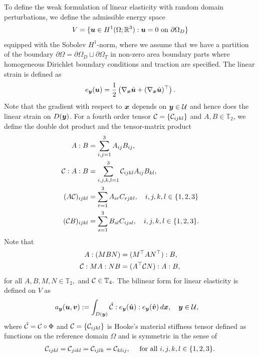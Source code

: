 To define the weak formulation of linear elasticity with random domain perturbations, we define the admissible energy space 
\begin{align}\label{eq:def_Vspace}
    V = \{ {\boldsymbol{u}} \in H^1(\Omega;\mathbb{R}^3) :  {\boldsymbol{u}} =  0  \text{ on }\partial \Omega_D   \}
\end{align}
equipped with the Sobolev $H^1$-norm, where we assume that we have a partition of the boundary $\partial \Omega  = \partial \Omega_D \sqcup \partial \Omega_T$ in non-zero area boundary parts where homogeneous Dirichlet boundary conditions and traction are specified. 
The linear strain is defined as 
\begin{align*}
    e_{{\boldsymbol{y}}}({\boldsymbol{u}}) = \frac 1 2 \left(  \nabla_{{\boldsymbol{x}}} \hat {{\boldsymbol{u}}} +  (\nabla_{{\boldsymbol{x}}} \hat {{\boldsymbol{u}}})^\top \right).
\end{align*}
Note that the gradient with respect to ${\boldsymbol{x}}$ depends on ${\boldsymbol{y}} \in \mathcal{U}$ and hence does the linear strain on $D({\boldsymbol{y}})$.
For a fourth order tensor $\mathcal{C} = \{ \mathcal{C}_{ijkl}\}$ and $A,B \in \mathbb{T}_2$, we define the double dot product and the tensor-matrix product
\begin{align*}
    A : B &= \sum_{i,j=1}^3 A_{ij} B_{ij},  \\
    \mathcal{C} : A :B &= \sum_{i,j,k,l=1}^3 \mathcal{C}_{ijkl} A_{ij}B_{kl}, \\
    (A\mathcal{C})_{ijkl} &= \sum_{r=1}^3 A_{ir} C_{rjkl}, \quad i,j,k,l\in \{1,2,3\}\\
    (\mathcal{C} B)_{ijkl} &= \sum_{s=1}^3 B_{sl} C_{ijsl}, \quad i,j,k,l\in \{1,2,3\}.
\end{align*} 
Note that 
\begin{align*}
     A : (MBN) &= (M^\top A N^\top) : B , \\
     \mathcal{C} : MA : NB &=  (A^\top \mathcal{C} N) : A : B, 
\end{align*}
for all $A,B,M,N \in \mathbb{T}_2,$ and $ \mathcal{C} \in \mathbb{T}_4.$
 The bilinear form for linear elasticity is defined on $V$ as
 \begin{align*}
    a_{\boldsymbol{y}}({\boldsymbol{u}},{\boldsymbol{v}}) &:=   \int_{D({\boldsymbol{y}})} \hat{\mathcal{C}}:  e_{\boldsymbol{y}}( \hat {{\boldsymbol{u}}}) : e_{\boldsymbol{y}}( \hat {{\boldsymbol{v}}})  \mathop{d\boldsymbol{x}}, \quad {\boldsymbol{y}} \in \mathcal{U},
\end{align*} where  $\hat {\mathcal{C}}= \mathcal{C} \circ \Phi $ and $ \mathcal{C}= \{ \mathcal{C}_{ijkl} \}$ is Hooke's material stiffness tensor defined as functions on the reference domain $\Omega$ and is symmetric in the sense of
\begin{align}\label{eq:symmetryC}
    \mathcal{C}_{ijkl} = \mathcal{C}_{jikl} = \mathcal{C}_{ijlk} = \mathcal{C}_{klij},\quad \text{ for all } i,j,k,l \in \{1,2,3\}.
\end{align}

